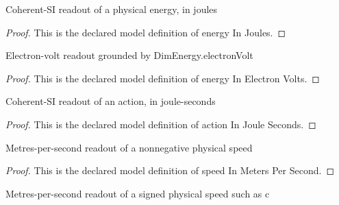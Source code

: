 \begin{definition}
  \label{def:physics:phyx-mini-0659:phyxminiproblems-problemphyxmini0659-energyinjoules}
  Coherent-SI readout of a physical energy, in joules
\end{definition}
\begin{proof}
  This is the declared model definition of energy In Joules.
\end{proof}
\begin{definition}
  \label{def:physics:phyx-mini-0659:phyxminiproblems-problemphyxmini0659-energyinelectronvolts}
  Electron-volt readout grounded by DimEnergy.electronVolt
\end{definition}
\begin{proof}
  This is the declared model definition of energy In Electron Volts.
\end{proof}
\begin{definition}
  \label{def:physics:phyx-mini-0659:phyxminiproblems-problemphyxmini0659-actioninjouleseconds}
  Coherent-SI readout of an action, in joule-seconds
\end{definition}
\begin{proof}
  This is the declared model definition of action In Joule Seconds.
\end{proof}
\begin{definition}
  \label{def:physics:phyx-mini-0659:phyxminiproblems-problemphyxmini0659-speedinmeterspersecond}
  Metres-per-second readout of a nonnegative physical speed
\end{definition}
\begin{proof}
  This is the declared model definition of speed In Meters Per Second.
\end{proof}
\begin{definition}
  \label{def:physics:phyx-mini-0659:phyxminiproblems-problemphyxmini0659-lightspeedinmeterspersecond}
  Metres-per-second readout of a signed physical speed such as c
\end{definition}

